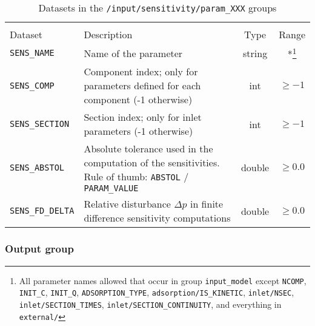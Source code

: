 \begin{table}[!ht]
\footnotesize
\begin{tabu}to \linewidth[m]{lX[m]cc} \toprule
{} \\
\rowfont[c]\normalfont Dataset & Description & Type & Range \everyrow{\midrule}\\      
\texttt{SENS\_NAME} & Name of the parameter & string & *\footnote{All parameter names allowed that occur in group \texttt{input\_model} except \texttt{NCOMP}, \texttt{INIT\_C}, \texttt{INIT\_Q}, \texttt{ADSORPTION\_TYPE}, \texttt{adsorption/IS\_KINETIC}, \texttt{inlet/NSEC}, \texttt{inlet/SECTION\_TIMES}, \texttt{inlet/SECTION\_CONTINUITY}, and everything in \texttt{external/}} \\
\texttt{SENS\_COMP} & Component index; only for parameters defined for each component (-1 otherwise) & int & $\geq -1$\\
\texttt{SENS\_SECTION} & Section index; only for inlet parameters (-1 otherwise) & int & $\geq -1$\\
\texttt{SENS\_ABSTOL} & Absolute tolerance used in the computation of the sensitivities. Rule of thumb: \texttt{ABSTOL} / \texttt{PARAM\_VALUE} & double & $\geq 0.0$\\
\texttt{SENS\_FD\_DELTA} & Relative disturbance $\Delta p$ in finite difference sensitivity computations & double & $\geq 0.0$\everyrow{}\\
\bottomrule
\end{tabu}
\caption{\label{tab:FFSensitivityParam}Datasets in the \texttt{/input/sensitivity/param\_XXX} groups}
\end{table}

\FloatBarrier
\subsubsection{Output group}


